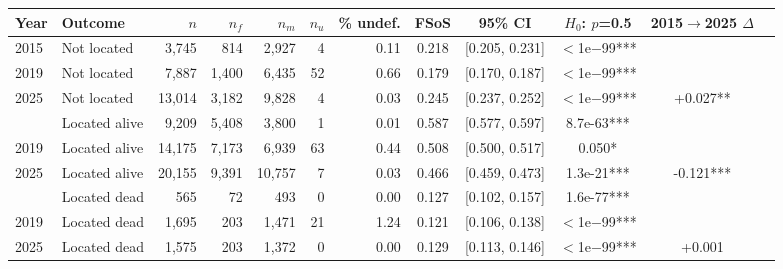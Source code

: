\begin{tabular}{llrrrrrccccl}
\toprule
Year & Outcome & $n$ & $n_f$ & $n_m$ & $n_u$ & \% undef. & FSoS & 95\% CI & $H_0$: $p$=0.5 & 2015$\to$2025 $\Delta$ & \\
\midrule
2015 & Not located & 3,745 & 814 & 2,927 & 4 & 0.11 & 0.218 & [0.205, 0.231] & $<$1e$-$99*** &  & \\
2019 & Not located & 7,887 & 1,400 & 6,435 & 52 & 0.66 & 0.179 & [0.170, 0.187] & $<$1e$-$99*** &  & \\
2025 & Not located & 13,014 & 3,182 & 9,828 & 4 & 0.03 & 0.245 & [0.237, 0.252] & $<$1e$-$99*** & +0.027** & \\
\addlinespace
2015 & Located alive & 9,209 & 5,408 & 3,800 & 1 & 0.01 & 0.587 & [0.577, 0.597] & 8.7e-63*** &  & \\
2019 & Located alive & 14,175 & 7,173 & 6,939 & 63 & 0.44 & 0.508 & [0.500, 0.517] & 0.050* &  & \\
2025 & Located alive & 20,155 & 9,391 & 10,757 & 7 & 0.03 & 0.466 & [0.459, 0.473] & 1.3e-21*** & -0.121*** & \\
\addlinespace
2015 & Located dead & 565 & 72 & 493 & 0 & 0.00 & 0.127 & [0.102, 0.157] & 1.6e-77*** &  & \\
2019 & Located dead & 1,695 & 203 & 1,471 & 21 & 1.24 & 0.121 & [0.106, 0.138] & $<$1e$-$99*** &  & \\
2025 & Located dead & 1,575 & 203 & 1,372 & 0 & 0.00 & 0.129 & [0.113, 0.146] & $<$1e$-$99*** & +0.001 & \\
\bottomrule
\end{tabular}
